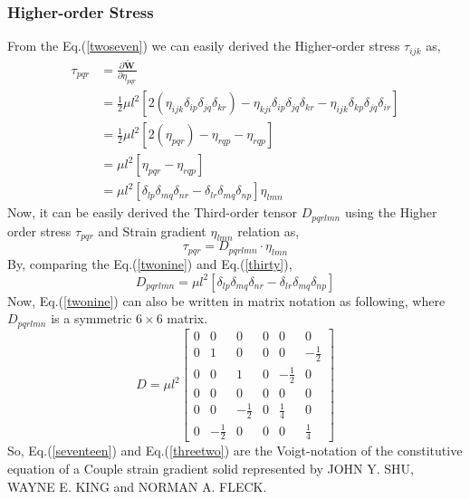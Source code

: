 \documentclass[12pt]{article}
\begin{document}
\subsubsection{ Higher-order Stress}
From the Eq.(\ref{twoseven}) we can easily derived the Higher-order stress $\tau_{ijk}$ as,
\begin{equation}\label{twonine}
\begin{aligned}
\tau_{pqr} & = \frac{\partial \tilde{\mathbf{W}} }{\partial \eta_{pqr}} \\
& = \frac{1}{2}\mu l^2 [ 2(\eta_{ijk} \delta_{ip} \delta_{jq} \delta_{kr}) - \eta_{kji} \delta_{ip} \delta_{jq} \delta_{kr} - \eta_{ijk} \delta_{kp} \delta_{jq} \delta_{ir} ] \\
& =  \frac{1}{2}\mu l^2 [ 2(\eta_{pqr}) - \eta_{rqp} -\eta_{rqp} ] \\
& = \mu l^2 [ \eta_{pqr} - \eta_{rqp} ] \\
& = \mu l^2 [ \delta_{lp} \delta_{mq} \delta_{nr} - \delta_{lr} \delta_{mq} \delta_{np} ]  \eta_{lmn}
\end{aligned}
\end{equation}
Now, it can be easily derived the Third-order tensor $D_{pqrlmn}$ using the Higher order stress $ \tau_{pqr} $ and Strain gradient $ \eta_{lmn} $ relation as,
\begin{equation}\label{thirty}
\tau_{pqr} = D_{pqrlmn} \cdot \eta_{lmn}
\end{equation}
By, comparing the Eq.(\ref{twonine}) and Eq.(\ref{thirty}),
\begin{equation}\label{threeone}
D_{pqrlmn} = \mu l^2 [ \delta_{lp} \delta_{mq} \delta_{nr} - \delta_{lr} \delta_{mq} \delta_{np} ]
\end{equation}
Now, Eq.(\ref{twonine}) can also be written in matrix notation as following, where $D_{pqrlmn}$ is a symmetric $6\times6$ matrix.
\begin{equation}\label{threetwo}
D = \mu l^2
\begin{bmatrix}
0 & 0 & 0 & 0 & 0 & 0  \\
0 & 1 & 0  & 0  & 0  & -\frac{1}{2} \\
0 & 0 & 1 & 0  & -\frac{1}{2}  & 0 \\
0 & 0 & 0 & 0 & 0 & 0 \\
0 & 0 & -\frac{1}{2}  & 0 & \frac{1}{4} & 0 \\
0 & -\frac{1}{2} & 0 & 0 & 0 & \frac{1}{4} 
\end{bmatrix}
\end{equation}
So, Eq.(\ref{seventeen}) and Eq.(\ref{threetwo}) are the Voigt-notation of the constitutive equation of a Couple strain gradient solid represented by JOHN Y. SHU, WAYNE E. KING and NORMAN A. FLECK. 
\end{document}
